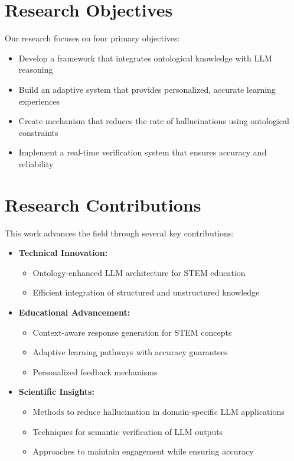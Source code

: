 \section{Research Objectives}

Our research focuses on four primary objectives:

\begin{itemize}
    \item Develop a framework that integrates ontological knowledge with LLM reasoning
    \item Build an adaptive system that provides personalized, accurate learning experiences
    \item Create mechanism that reduces the rate of hallucinations using ontological constraints
    \item Implement a real-time verification system that ensures accuracy and reliability
\end{itemize}

\section{Research Contributions}

This work advances the field through several key contributions:

\begin{itemize}
    \item \textbf{Technical Innovation:}
        \begin{itemize}
            \item Ontology-enhanced LLM architecture for STEM education
            \item Efficient integration of structured and unstructured knowledge
        \end{itemize}
    
    \item \textbf{Educational Advancement:}
        \begin{itemize}
            \item Context-aware response generation for STEM concepts
            \item Adaptive learning pathways with accuracy guarantees
            \item Personalized feedback mechanisms
        \end{itemize}
    
    \item \textbf{Scientific Insights:}
        \begin{itemize}
            \item Methods to reduce hallucination in domain-specific LLM applications
            \item Techniques for semantic verification of LLM outputs
            \item Approaches to maintain engagement while ensuring accuracy
        \end{itemize}
\end{itemize}

